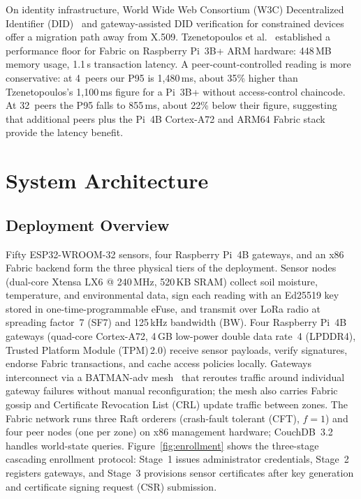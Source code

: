 \documentclass[a4paper,fleqn]{cas-dc}
\begin{document}
On identity infrastructure, World Wide Web Consortium (W3C)
Decentralized Identifier (DID)~\cite{w3c_did_core} and
gateway-assisted DID verification for constrained devices~\cite{ferdous2019ssi}
offer
a migration path away from X.509. Tzenetopoulos et
al.~\cite{tzenetopoulos2022hlfkubed} established a performance floor
for Fabric on Raspberry Pi~3B+ ARM hardware: 448\,MB memory usage,
1.1\,s transaction latency. A peer-count-controlled reading is more
conservative: at 4~peers our P95 is 1,480\,ms, about 35\% higher than
Tzenetopoulos's 1,100\,ms figure for a Pi~3B+ without access-control
chaincode. At 32~peers the P95 falls to 855\,ms, about 22\% below their
figure, suggesting that additional peers plus the Pi~4B Cortex-A72 and
ARM64 Fabric stack provide the latency benefit.

\section{System Architecture}
\label{sec:architecture}

\subsection{Deployment Overview}
\label{subsec:overview}

Fifty ESP32-WROOM-32 sensors, four Raspberry Pi~4B gateways, and
an x86 Fabric backend form the three physical tiers of the deployment.
Sensor nodes (dual-core Xtensa LX6 @ 240\,MHz, 520\,KB SRAM) collect soil
moisture, temperature, and environmental data, sign each reading with
an Ed25519 key stored in one-time-programmable eFuse, and transmit
over LoRa radio at spreading factor~7 (SF7) and 125\,kHz bandwidth
(BW). Four Raspberry Pi~4B gateways
(quad-core Cortex-A72, 4\,GB low-power double data rate~4
(LPDDR4), Trusted Platform Module (TPM)\,2.0) receive sensor
payloads, verify signatures, endorse Fabric transactions, and cache
access policies locally. Gateways interconnect via a BATMAN-adv
mesh~\cite{batman2010} that reroutes traffic around individual gateway
failures without manual reconfiguration; the mesh also carries Fabric
gossip and Certificate Revocation List (CRL) update traffic between
zones. The Fabric network runs
three Raft orderers
(crash-fault tolerant (CFT), $f{=}1$) and four peer nodes (one per zone)
on x86 management hardware; CouchDB~3.2 handles world-state queries.
Figure~\ref{fig:enrollment} shows the three-stage cascading
enrollment protocol: Stage~1 issues administrator credentials, Stage~2
registers gateways, and Stage~3 provisions sensor certificates after
key generation and certificate signing request (CSR) submission.
\end{document}
